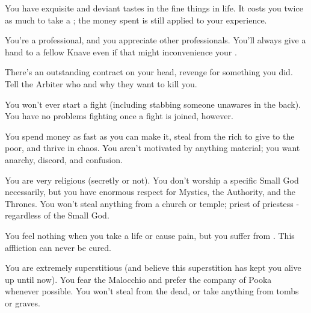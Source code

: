 {    

    You have exquisite and deviant tastes in the fine things in life. It costs you twice as much to take a ; the money spent is still applied to your experience.


    You're a professional, and you appreciate other professionals.  You'll always give a hand to a fellow Knave even if that might inconvenience your .


    There's an outstanding contract on your head, revenge for something you did.  Tell the Arbiter who and why they want to kill you.


    You won't ever start a fight (including stabbing someone unawares in the back).  You have no problems fighting once a fight is joined, however.  

    \newpage 


    You spend money as fast as you can make it, steal from the rich to give to the poor, and thrive in chaos.  You aren't motivated by anything material; you want anarchy, discord, and confusion.    


    You are very religious (secretly or not).  You don't worship a specific Small God necessarily, but you have enormous respect for Mystics, the Authority, and the Thrones.  You won't steal anything from a church or temple; priest of priestess - regardless of the Small God.



    You feel nothing when you take a life or cause pain, but you suffer from .  This affliction can never be cured.



    You are extremely superstitious (and believe this superstition has kept you alive up until now).  You fear the Malocchio and prefer the company of Pooka whenever possible.  You won't steal from the dead, or take anything from tombs or graves.


}

